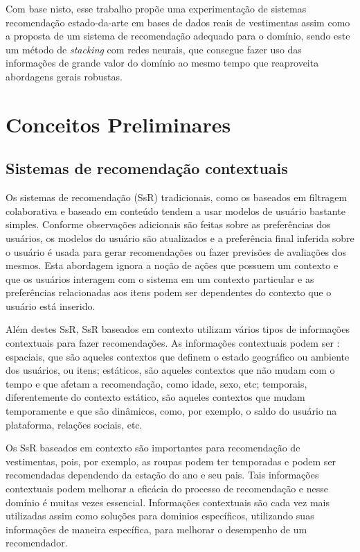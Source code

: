 \documentclass[sigconf]{acmart}
\begin{document}
Com base nisto, esse trabalho propõe uma experimentação de sistemas recomendação estado-da-arte em bases de dados reais de vestimentas assim como a proposta de um sistema de recomendação adequado para o domínio, sendo este um método de \textit{stacking} com redes neurais, que consegue fazer uso das informações de grande valor do domínio ao mesmo tempo que reaproveita abordagens gerais robustas.

\section{Conceitos Preliminares}

\subsection{Sistemas de recomendação contextuais}
Os sistemas de recomendação (SsR) tradicionais, como os baseados em filtragem colaborativa e baseado em conteúdo tendem a usar modelos de usuário bastante simples. Conforme observações adicionais são feitas sobre as preferências dos usuários, os modelos do usuário são atualizados e a preferência final inferida sobre o usuário é usada para gerar recomendações ou fazer previsões de avaliações dos mesmos. Esta abordagem ignora a noção de ações que possuem um contexto \cite{adomavicius2011context} e que os usuários interagem com o sistema em um contexto particular e as preferências relacionadas aos itens podem ser dependentes do contexto que o usuário está inserido.

Além destes SsR, SsR baseados em contexto utilizam vários tipos de informações contextuais para fazer recomendações. As informações contextuais podem ser \cite{haruna2017context}: espaciais, que são aqueles contextos que definem o estado geográfico ou ambiente dos usuários, ou itens; estáticos, são aqueles contextos que não mudam com o tempo e que afetam a recomendação, como idade, sexo, etc; temporais, diferentemente do contexto estático, são aqueles contextos que mudam temporamente e que são dinâmicos, como, por exemplo, o saldo do usuário na plataforma, relações sociais, etc.

Os SsR baseados em contexto são importantes para recomendação de vestimentas, pois, por exemplo, as roupas podem ter temporadas e podem ser recomendadas dependendo da estação do ano e seu pais. Tais informações contextuais podem melhorar a eficácia do processo de recomendação e nesse domínio é muitas vezes essencial. Informações contextuais são cada vez mais utilizadas assim como soluções para dominios específicos, utilizando suas informações de maneira específica, para melhorar o desempenho de um recomendador.
\end{document}
